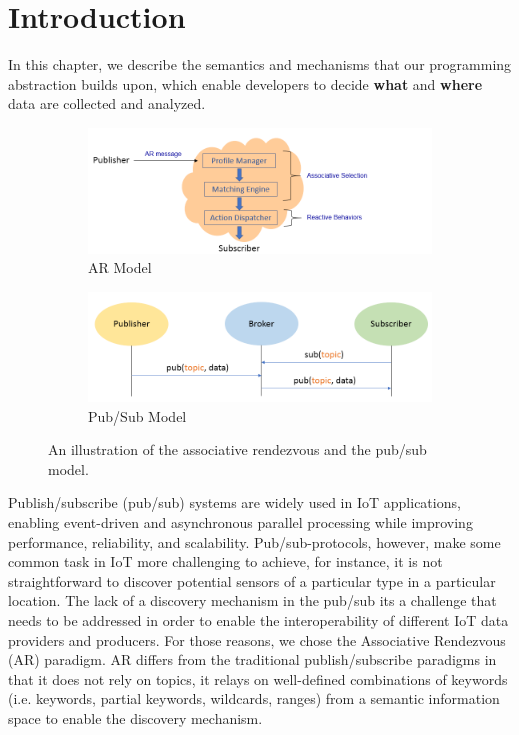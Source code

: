 \section{Introduction}

In this chapter, we describe the semantics and mechanisms that our programming abstraction builds upon, which enable developers to decide \textbf{what} and \textbf{where} data are collected and analyzed. 

\begin{figure}[h]
\centering
\begin{subfigure}[b]{0.7\textwidth}
   \includegraphics[width=1.1\linewidth]{Figures/AR.png}
   \caption{AR Model}
\end{subfigure}
\begin{subfigure}[b]{0.7\textwidth}
   \includegraphics[width=1.1\linewidth]{Figures/PUB.png}
   \caption{Pub/Sub Model}\label{fig:ARExample2} 
\end{subfigure}
\caption{An illustration of the associative rendezvous and the pub/sub model.}\label{fig:ARPUB} 
\end{figure}


Publish/subscribe (pub/sub) systems are widely used in IoT applications, enabling event-driven and asynchronous parallel processing while improving performance, reliability, and scalability. Pub/sub-protocols, however, make some common task in IoT more challenging to achieve, for instance, it is not straightforward to discover potential sensors of a particular type in a particular location. The lack of a discovery mechanism in the pub/sub its a challenge that needs to be addressed in order to enable the interoperability of different IoT data providers and producers. For those reasons, we chose the Associative Rendezvous (AR) paradigm. AR differs from the traditional publish/subscribe paradigms in that it does not rely on topics, it relays on well-defined combinations of keywords (i.e. keywords, partial keywords, wildcards, ranges) from a semantic information space to enable the discovery mechanism.

